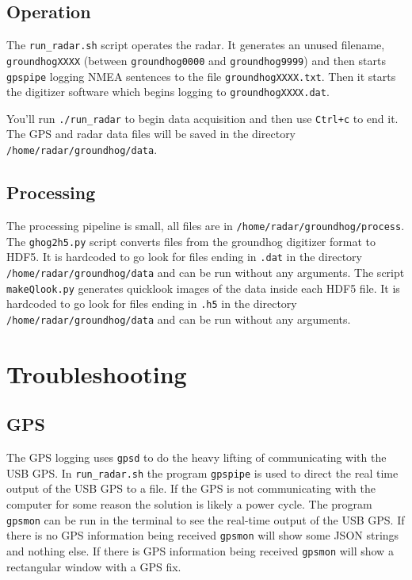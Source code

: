 \documentclass[titlepage]{article}
\begin{document}
\subsection{Operation}
The \verb+run_radar.sh+ script operates the radar. It generates an unused filename, \verb|groundhogXXXX| (between \verb+groundhog0000+ and \verb+groundhog9999+) and then starts \verb+gpspipe+ logging NMEA sentences to the file \verb|groundhogXXXX.txt|. Then it starts the digitizer software which begins logging to \verb|groundhogXXXX.dat|.

You'll run \verb|./run_radar| to begin data acquisition and then use \verb|Ctrl+c| to end it. The GPS and radar data files will be saved in the directory \verb|/home/radar/groundhog/data|.

\subsection{Processing}
The processing pipeline is small, all files are in \verb|/home/radar/groundhog/process|. The \verb|ghog2h5.py| script converts files from the groundhog digitizer format to HDF5. It is hardcoded to go look for files ending in \verb|.dat| in the directory \verb|/home/radar/groundhog/data| and can be run without any arguments. The script \verb|makeQlook.py| generates quicklook images of the data inside each HDF5 file. It is hardcoded to go look for files ending in \verb|.h5| in the directory \verb|/home/radar/groundhog/data| and can be run without any arguments.

\section{Troubleshooting}
\subsection{GPS} \label{trouble_gps}
The GPS logging uses \verb|gpsd| to do the heavy lifting of communicating with the USB GPS. In \verb|run_radar.sh| the program \verb|gpspipe| is used to direct the real time output of the USB GPS to a file. If the GPS is not communicating with the computer for some reason the solution is likely a power cycle. The program \verb|gpsmon| can be run in the terminal to see the real-time output of the USB GPS. If there is no GPS information being received \verb|gpsmon| will show some JSON strings and nothing else. If there is GPS information being received \verb|gpsmon| will show a rectangular window with a GPS fix.
\end{document}
